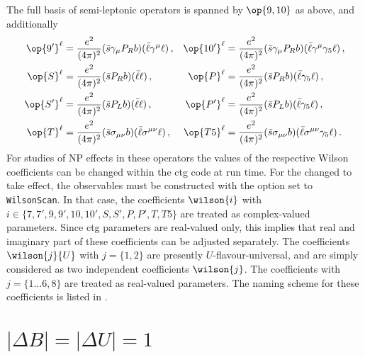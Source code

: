 The full basis of semi-leptonic operators is spanned by $\op{9,10}$ as above, and additionally
\begin{align}
  \op{9'}^{\ell}  & = \frac{e^2}{(4\pi)^2} (\bar{s} \gamma_\mu P_R b) 
                      (\bar{\ell} \gamma^\mu \ell) \,, &
  \op{10'}^{\ell} & = \frac{e^2}{(4\pi)^2} (\bar{s} \gamma_\mu P_R b)
                      (\bar{\ell} \gamma^\mu \gamma_5 \ell) \,,\\
  \op{S}^{\ell}   & = \frac{e^2}{(4\pi)^2} (\bar{s} P_R b)
                      (\bar{\ell} \ell) \,, &
  \op{P}^{\ell}   & = \frac{e^2}{(4\pi)^2} (\bar{s} P_R b)
                      (\bar{\ell} \gamma_5 \ell) \,,\\
  \op{S'}^{\ell}  & = \frac{e^2}{(4\pi)^2} (\bar{s} P_L b)
                      (\bar{\ell} \ell) \,, &
  \op{P'}^{\ell}  & = \frac{e^2}{(4\pi)^2} (\bar{s} P_L b)
                      (\bar{\ell} \gamma_5 \ell) \,,\\
  \op{T}^{\ell}   & = \frac{e^2}{(4\pi)^2} (\bar{s} \sigma_{\mu\nu} b)
                      (\bar{\ell} \sigma^{\mu\nu} \ell) \,, &
  \op{T5}^{\ell}  & = \frac{e^2}{(4\pi)^2} (\bar{s} \sigma_{\mu\nu} b)
                      (\bar{\ell} \sigma^{\mu\nu} \gamma_5 \ell) \,.
\end{align}
For studies of NP effects in these operators the values of the respective Wilson coefficients
can be changed within the ctg code at run time. For the changed to take effect, the observables
must be constructed with the option  set to \texttt{WilsonScan}. In that case, the
coefficients $\wilson{i}$ with $i\in \lbrace 7,7',9,9',10,10',S,S',P,P',T,T5\rbrace$ are treated
as complex-valued parameters.
Since ctg parameters are real-valued only, this implies that real and
imaginary part of these coefficients can be adjusted separately.
The coefficients $\wilson{j}{U}$ with $j=\lbrace 1,2\rbrace$ are presently
$U$-flavour-universal, and are simply considered as two independent coefficients $\wilson{j}$.
The coefficients with $j=\lbrace 1\dots 6, 8\rbrace$ are treated as real-valued parameters.
The naming scheme for these coefficients is listed in .


%
%

\section{$|\Delta B| = |\Delta U| = 1$}

